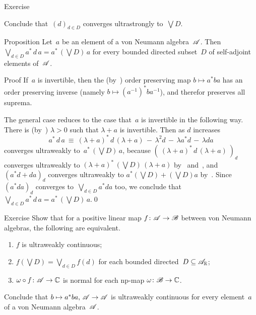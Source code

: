 \documentclass[a]{subfiles}
\begin{document}
\begin{parsec}
\begin{point}{Exercise}
\begin{point}
Conclude that~$(d)_{d\in D}$ converges ultrastrongly to~$\bigvee D$.
\end{point}
\end{point}
%
%
\begin{point}[ad-normal]{Proposition}%
Let~$a$ be an element of a von Neumann algebra~$\mathscr{A}$.
Then~$\bigvee_{d\in D} a^*\,d\,a = a^*\,(\bigvee D)\, a$
for every bounded directed subset~$D$ of self-adjoint
elements of~$\mathscr{A}$.
\begin{point}[ad-normal-1]{Proof}%
If~$a$ is invertible,
then the (by~) order preserving map $b\mapsto a^*ba$
has an order preserving inverse (namely $b\mapsto (a^{-1})^* b a^{-1}$),
and therefor preserves all suprema.
\begin{point}%
The general case reduces to the case that~$a$ 
is invertible
in the following way.
There is (by~)
 $\lambda>0$ such that $\lambda+a$ is invertible.
Then as $d$ increases 
\begin{equation*}
a^*\,d\,a \ \equiv\  (\lambda+a)^*\,d\,(\lambda+a) \,-\,
 \lambda^2d \,-\, \lambda a^*d \,-\, \lambda da
\end{equation*}
converges ultraweakly
to~$a^* \,(\bigvee D)\,a$,
because $(\ (\lambda+a)^*\,d\,(\lambda+a)\ )_d$
converges ultraweakly to $(\lambda+a)^*\,(\bigvee D)\,(\lambda+a)$
by~ and~,
and $(a^*d+da)_d$ converges ultraweakly to $a^*(\bigvee D)+(\bigvee D)a$
by~.
Since~$(a^*da)_d$ converges to~$\bigvee_{d\in D} a^*d a$ too,
we conclude that~$\bigvee_{d\in D} a^* \,d\, a = a^*\,(\bigvee D)\,a$.\qed
\end{point}
\end{point}
\end{point}
\begin{point}[p-uwcont]{Exercise}%
Show that for a positive linear map $f\colon \mathscr{A}\to\mathscr{B}$
between von Neumann algebras,
the following are equivalent.
\begin{enumerate}
\item
$f$ is ultraweakly continuous;
\item
$f(\bigvee D)=\bigvee_{d\in D}f(d)$ for each bounded 
directed~$D\subseteq\mathscr{A}_{\mathbb{R}}$;
\item 
$\omega\circ f\colon \mathscr{A}\to\mathbb{C}$ is normal 
for each np-map $\omega\colon \mathscr{B}\to\mathbb{C}$.
\end{enumerate}
Conclude that $b\mapsto a^*ba,\,\mathscr{A}\to\mathscr{A}$
is ultraweakly
continuous for every element~$a$ of a von Neumann 
algebra~$\mathscr{A}$.


\end{point}
\end{parsec}
\end{document}
